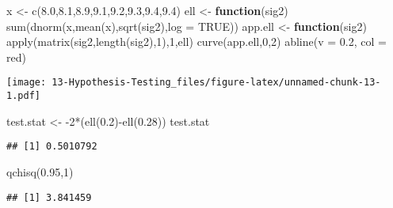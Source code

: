 \documentclass[
]{book}
\newenvironment{Shaded}{\begin{snugshade}}{\end{snugshade}}
\newcommand{\AttributeTok}[1]{\textcolor[rgb]{0.77,0.63,0.00}{#1}}
\newcommand{\ConstantTok}[1]{\textcolor[rgb]{0.00,0.00,0.00}{#1}}
\newcommand{\ControlFlowTok}[1]{\textcolor[rgb]{0.13,0.29,0.53}{\textbf{#1}}}
\newcommand{\DecValTok}[1]{\textcolor[rgb]{0.00,0.00,0.81}{#1}}
\newcommand{\FloatTok}[1]{\textcolor[rgb]{0.00,0.00,0.81}{#1}}
\newcommand{\FunctionTok}[1]{\textcolor[rgb]{0.00,0.00,0.00}{#1}}
\newcommand{\NormalTok}[1]{#1}
\newcommand{\OtherTok}[1]{\textcolor[rgb]{0.56,0.35,0.01}{#1}}
\newcommand{\SpecialCharTok}[1]{\textcolor[rgb]{0.00,0.00,0.00}{#1}}
\newcommand{\StringTok}[1]{\textcolor[rgb]{0.31,0.60,0.02}{#1}}
\begin{document}
\begin{Shaded}
\begin{Highlighting}[]
\NormalTok{x }\OtherTok{\textless{}{-}} \FunctionTok{c}\NormalTok{(}\FloatTok{8.0}\NormalTok{,}\FloatTok{8.1}\NormalTok{,}\FloatTok{8.9}\NormalTok{,}\FloatTok{9.1}\NormalTok{,}\FloatTok{9.2}\NormalTok{,}\FloatTok{9.3}\NormalTok{,}\FloatTok{9.4}\NormalTok{,}\FloatTok{9.4}\NormalTok{)}
\NormalTok{ell }\OtherTok{\textless{}{-}} \ControlFlowTok{function}\NormalTok{(sig2) }\FunctionTok{sum}\NormalTok{(}\FunctionTok{dnorm}\NormalTok{(x,}\FunctionTok{mean}\NormalTok{(x),}\FunctionTok{sqrt}\NormalTok{(sig2),}\AttributeTok{log =} \ConstantTok{TRUE}\NormalTok{))}
\NormalTok{app.ell }\OtherTok{\textless{}{-}} \ControlFlowTok{function}\NormalTok{(sig2) }\FunctionTok{apply}\NormalTok{(}\FunctionTok{matrix}\NormalTok{(sig2,}\FunctionTok{length}\NormalTok{(sig2),}\DecValTok{1}\NormalTok{),}\DecValTok{1}\NormalTok{,ell)}
\FunctionTok{curve}\NormalTok{(app.ell,}\DecValTok{0}\NormalTok{,}\DecValTok{2}\NormalTok{)  }
\FunctionTok{abline}\NormalTok{(}\AttributeTok{v =} \FloatTok{0.2}\NormalTok{, }\AttributeTok{col =} \StringTok{\textquotesingle{}red\textquotesingle{}}\NormalTok{)}
\end{Highlighting}
\end{Shaded}

\texttt{[image: 13-Hypothesis-Testing\_files/figure-latex/unnamed-chunk-13-1.pdf]}

\begin{Shaded}
\begin{Highlighting}[]
\NormalTok{test.stat }\OtherTok{\textless{}{-}} \SpecialCharTok{{-}}\DecValTok{2}\SpecialCharTok{*}\NormalTok{(}\FunctionTok{ell}\NormalTok{(}\FloatTok{0.2}\NormalTok{)}\SpecialCharTok{{-}}\FunctionTok{ell}\NormalTok{(}\FloatTok{0.28}\NormalTok{))}
\NormalTok{test.stat}
\end{Highlighting}
\end{Shaded}

\begin{verbatim}
## [1] 0.5010792
\end{verbatim}

\begin{Shaded}
\begin{Highlighting}[]
\FunctionTok{qchisq}\NormalTok{(}\FloatTok{0.95}\NormalTok{,}\DecValTok{1}\NormalTok{)}
\end{Highlighting}
\end{Shaded}

\begin{verbatim}
## [1] 3.841459
\end{verbatim}
\end{document}
